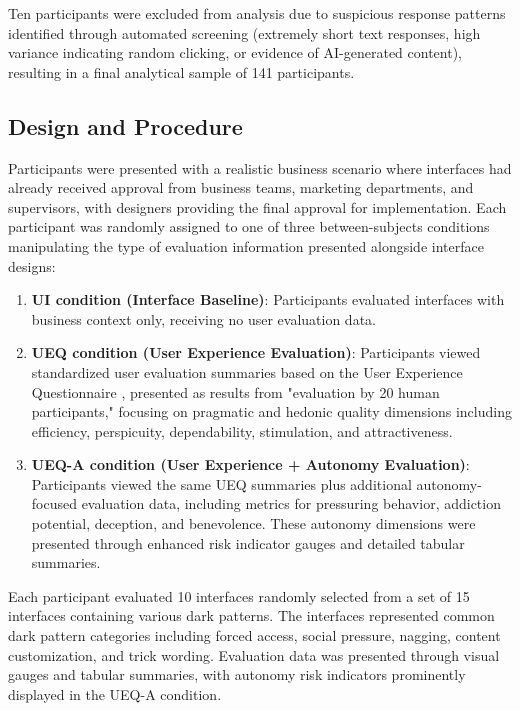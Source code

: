 Ten participants were excluded from analysis due to suspicious response patterns identified through automated screening (extremely short text responses, high variance indicating random clicking, or evidence of AI-generated content), resulting in a final analytical sample of 141 participants.

\subsection{Design and Procedure}

Participants were presented with a realistic business scenario where interfaces had already received approval from business teams, marketing departments, and supervisors, with designers providing the final approval for implementation. Each participant was randomly assigned to one of three between-subjects conditions manipulating the type of evaluation information presented alongside interface designs:

\begin{enumerate}
\item \textbf{UI condition (Interface Baseline)}: Participants evaluated interfaces with business context only, receiving no user evaluation data.
\item \textbf{UEQ condition (User Experience Evaluation)}: Participants viewed standardized user evaluation summaries based on the User Experience Questionnaire \cite{laugwitz2008construction}, presented as results from "evaluation by 20 human participants," focusing on pragmatic and hedonic quality dimensions including efficiency, perspicuity, dependability, stimulation, and attractiveness.
\item \textbf{UEQ-A condition (User Experience + Autonomy Evaluation)}: Participants viewed the same UEQ summaries plus additional autonomy-focused evaluation data, including metrics for pressuring behavior, addiction potential, deception, and benevolence. These autonomy dimensions were presented through enhanced risk indicator gauges and detailed tabular summaries.
\end{enumerate}

Each participant evaluated 10 interfaces randomly selected from a set of 15 interfaces containing various dark patterns. The interfaces represented common dark pattern categories including forced access, social pressure, nagging, content customization, and trick wording. Evaluation data was presented through visual gauges and tabular summaries, with autonomy risk indicators prominently displayed in the UEQ-A condition.

